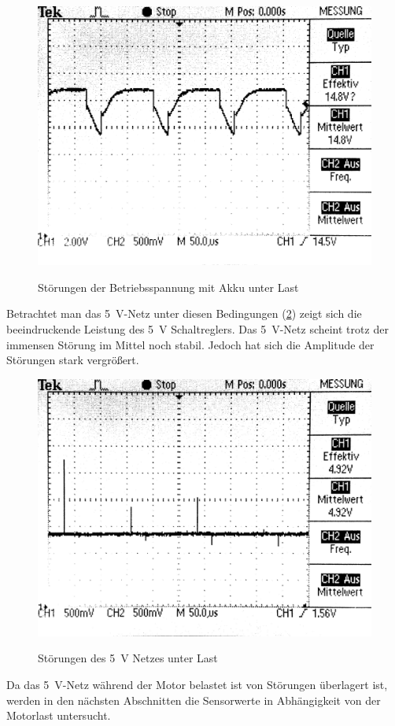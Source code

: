 \begin{figure}[H]
\centering
\includegraphics[width=.8\textwidth]{VCC_AKKU_LAST.png}\\
\caption{Störungen der Betriebsspannung mit Akku unter Last}%
\label{fig:akku_supply}
\end{figure}

Betrachtet man das \SI{5}{\V}-Netz unter diesen Bedingungen (\cref{fig:5V_last}) zeigt sich die beeindruckende Leistung des \SI{5}{\V} Schaltreglers.
Das \SI{5}{\V}-Netz scheint trotz der immensen Störung im Mittel noch stabil. Jedoch hat sich die Amplitude der Störungen
stark vergrößert.

\begin{figure}[H]
\centering
\includegraphics[width=.8\textwidth]{5V_LAST.png}\\
\caption{Störungen des \SI{5}{\V} Netzes unter Last}%
\label{fig:5V_last}
\end{figure}


Da das \SI{5}{\V}-Netz während der Motor belastet ist von Störungen überlagert ist, werden in den nächsten Abschnitten die Sensorwerte in Ab\-hän\-gig\-keit von der Motorlast untersucht.

